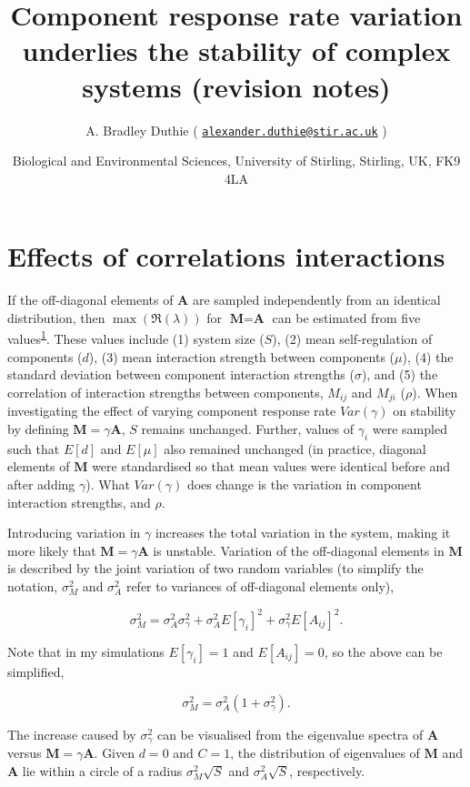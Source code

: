 \documentclass[]{article}
\title{Component response rate variation underlies the stability of complex
systems (revision notes)}
\author{A. Bradley Duthie (
\href{mailto:alexander.duthie@stir.ac.uk}{\nolinkurl{alexander.duthie@stir.ac.uk}}
)}
\date{Biological and Environmental Sciences, University of Stirling, Stirling,
UK, FK9 4LA}
\begin{document}
\maketitle

\hypertarget{effects-of-correlations-interactions}{%
\section{Effects of correlations
interactions}\label{effects-of-correlations-interactions}}

If the off-diagonal elements of \(\textbf{A}\) are sampled independently
from an identical distribution, then \(\max(\Re(\lambda))\) for
\(\textbf{M} = \textbf{A}\) can be estimated from five
values\textsuperscript{\protect\hyperlink{ref-Tang2014b}{1}}. These
values include (1) system size (\(S\)), (2) mean self-regulation of
components (\(d\)), (3) mean interaction strength between components
(\(\mu\)), (4) the standard deviation between component interaction
strengths (\(\sigma\)), and (5) the correlation of interaction strengths
between components, \(M_{ij}\) and \(M_{ji}\) (\(\rho\)). When
investigating the effect of varying component response rate
\(Var(\gamma)\) on stability by defining
\(\textbf{M} = \gamma\textbf{A}\), \(S\) remains unchanged. Further,
values of \(\gamma_{i}\) were sampled such that \(E[d]\) and \(E[\mu]\)
also remained unchanged (in practice, diagonal elements of
\(\textbf{M}\) were standardised so that mean values were identical
before and after adding \(\gamma\)). What \(Var(\gamma)\) does change is
the variation in component interaction strengths, and \(\rho\).

Introducing variation in \(\gamma\) increases the total variation in the
system, making it more likely that \(\textbf{M} = \gamma\textbf{A}\) is
unstable. Variation of the off-diagonal elements in \(\textbf{M}\) is
described by the joint variation of two random variables (to simplify
the notation, \(\sigma^{2}_{M}\) and \(\sigma^{2}_{A}\) refer to
variances of off-diagonal elements only),

\[\sigma^{2}_{M} = \sigma^{2}_{A}\sigma^{2}_{\gamma} + \sigma^{2}_{A}E[\gamma_{i}]^{2}+\sigma^{2}_{\gamma}E[A_{ij}]^{2}.\]

Note that in my simulations \(E[\gamma_{i}] = 1\) and \(E[A_{ij}] = 0\),
so the above can be simplified,

\[\sigma^{2}_{M} = \sigma^{2}_{A}(1 + \sigma^{2}_{\gamma}).\]

The increase caused by \(\sigma^{2}_\gamma\) can be visualised from the
eigenvalue spectra of \(\textbf{A}\) versus
\(\textbf{M} = \gamma\textbf{A}\). Given \(d = 0\) and \(C = 1\), the
distribution of eigenvalues of \(\textbf{M}\) and \(\textbf{A}\) lie
within a circle of a radius \(\sigma^{2}_{M}\sqrt{S}\) and
\(\sigma^{2}_{A}\sqrt{S}\), respectively.
\end{document}
